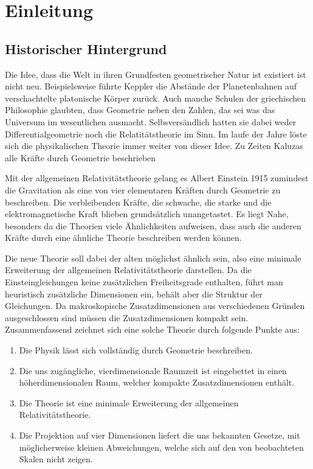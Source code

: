 \chapter{Einleitung}
\section{Historischer Hintergrund}
Die Idee, dass die Welt in ihren Grundfesten geometrischer Natur ist
existiert ist nicht neu.
Beispielsweise führte Keppler die Abstände der Planetenbahnen auf
verschachtelte platonische Körper zurück. Auch manche Schulen der griechischen
Philosophie glaubten, dass Geometrie neben den Zahlen, das sei was das Universum
im wesentlichen ausmacht.
Selbsversändlich hatten sie dabei weder Differentialgeometrie noch die 
Relatitätstheorie im Sinn.  
Im laufe der Jahre löste sich die physikalischen Theorie immer weiter von dieser Idee. 
Zu Zeiten Kaluzas alle Kräfte durch Geometrie beschrieben
 

Mit der allgemeinen Relativitätstheorie gelang es Albert Einstein 1915
zumindest die Gravitation als eine von vier elementaren Kräften durch Geometrie
zu beschreiben. Die verbleibenden Kräfte, die schwache, die starke und die elektromagnetische Kraft
blieben grundsätzlich unangetastet. Es liegt Nahe, besonders da die Theorien
viele Ähnlichkeiten aufweisen, dass auch die anderen Kräfte durch eine ähnliche
Theorie beschreiben werden können.

Die neue Theorie soll dabei der alten 
möglichst ähnlich sein, also eine minimale Erweiterung der allgemeinen
Relativitätstheorie darstellen.
Da die Einsteingleichungen keine
zusätzlichen Freiheitsgrade enthalten, führt man heuristisch zusätzliche
Dimensionen ein, behält aber die Struktur der Gleichungen.
Da makroskopische Zusatzdimensionen aus verschiedenen Gründen ausgeschlossen
sind müssen die Zusatzdimensionen kompakt sein.
Zusammenfassend zeichnet sich eine solche Theorie durch folgende Punkte aus:
\begin{enumerate} 
\item Die Physik lässt sich vollständig durch Geometrie beschreiben.
\item Die uns zugängliche, vierdimensionale Raumzeit ist eingebettet in einen
höherdimensionalen Raum, welcher kompakte Zusatzdimensionen enthält.
\item Die Theorie ist eine minimale Erweiterung der allgemeinen
Relativitätstheorie.
\item Die Projektion auf vier Dimensionen liefert die uns bekannten Gesetze, mit
möglicherweise kleinen Abweichungen, welche sich auf den von beobachteten Skalen
nicht zeigen.
\end{enumerate}